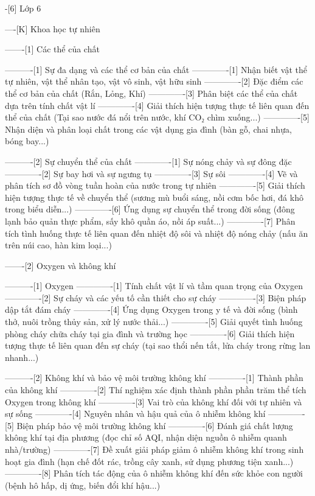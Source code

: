 -[6] Lớp 6

----[K] Khoa học tự nhiên

-------[1] Các thể của chất

----------[1] Sự đa dạng và các thể cơ bản của chất
-------------[1] Nhận biết vật thể tự nhiên, vật thể nhân tạo, vật vô sinh, vật hữu sinh
-------------[2] Đặc điểm các thể cơ bản của chất (Rắn, Lỏng, Khí)
-------------[3] Phân biệt các thể của chất dựa trên tính chất vật lí
-------------[4] Giải thích hiện tượng thực tế liên quan đến thể của chất (Tại sao nước đá nổi trên nước, khí CO₂ chìm xuống...)
-------------[5] Nhận diện và phân loại chất trong các vật dụng gia đình (bàn gỗ, chai nhựa, bóng bay...)

----------[2] Sự chuyển thể của chất
-------------[1] Sự nóng chảy và sự đông đặc
-------------[2] Sự bay hơi và sự ngưng tụ
-------------[3] Sự sôi
-------------[4] Vẽ và phân tích sơ đồ vòng tuần hoàn của nước trong tự nhiên
-------------[5] Giải thích hiện tượng thực tế về chuyển thể (sương mù buổi sáng, nồi cơm bốc hơi, đá khô trong biểu diễn...)
-------------[6] Ứng dụng sự chuyển thể trong đời sống (đông lạnh bảo quản thực phẩm, sấy khô quần áo, nồi áp suất...)
-------------[7] Phân tích tình huống thực tế liên quan đến nhiệt độ sôi và nhiệt độ nóng chảy (nấu ăn trên núi cao, hàn kim loại...)

-------[2] Oxygen và không khí

----------[1] Oxygen
-------------[1] Tính chất vật lí và tầm quan trọng của Oxygen
-------------[2] Sự cháy và các yếu tố cần thiết cho sự cháy
-------------[3] Biện pháp dập tắt đám cháy
-------------[4] Ứng dụng Oxygen trong y tế và đời sống (bình thở, nuôi trồng thủy sản, xử lý nước thải...)
-------------[5] Giải quyết tình huống phòng cháy chữa cháy tại gia đình và trường học
-------------[6] Giải thích hiện tượng thực tế liên quan đến sự cháy (tại sao thổi nến tắt, lửa cháy trong rừng lan nhanh...)

----------[2] Không khí và bảo vệ môi trường không khí
-------------[1] Thành phần của không khí
-------------[2] Thí nghiệm xác định thành phần phần trăm thể tích Oxygen trong không khí
-------------[3] Vai trò của không khí đối với tự nhiên và sự sống
-------------[4] Nguyên nhân và hậu quả của ô nhiễm không khí
-------------[5] Biện pháp bảo vệ môi trường không khí
-------------[6] Đánh giá chất lượng không khí tại địa phương (đọc chỉ số AQI, nhận diện nguồn ô nhiễm quanh nhà/trường)
-------------[7] Đề xuất giải pháp giảm ô nhiễm không khí trong sinh hoạt gia đình (hạn chế đốt rác, trồng cây xanh, sử dụng phương tiện xanh...)
-------------[8] Phân tích tác động của ô nhiễm không khí đến sức khỏe con người (bệnh hô hấp, dị ứng, biến đổi khí hậu...)

